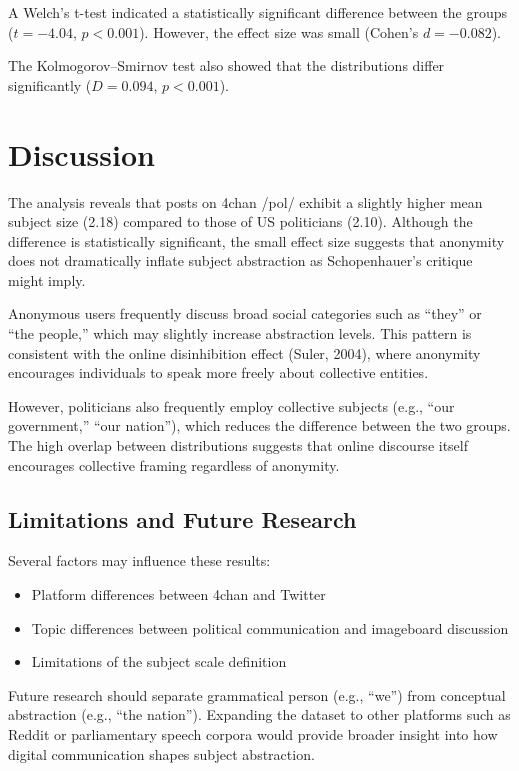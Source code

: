 \documentclass{article}
\begin{document}
A Welch's t-test indicated a statistically significant difference between
the groups ($t = -4.04$, $p < 0.001$). However, the effect size was small
(Cohen's $d = -0.082$).

The Kolmogorov–Smirnov test also showed that the distributions differ
significantly ($D = 0.094$, $p < 0.001$).

\section{Discussion}

The analysis reveals that posts on 4chan /pol/ exhibit a slightly higher mean 
subject size (2.18) compared to those of US politicians (2.10). Although the 
difference is statistically significant, the small effect size suggests that 
anonymity does not dramatically inflate subject abstraction as Schopenhauer's 
critique might imply.

Anonymous users frequently discuss broad social categories such as ``they'' 
or ``the people,'' which may slightly increase abstraction levels. This 
pattern is consistent with the online disinhibition effect (Suler, 2004), 
where anonymity encourages individuals to speak more freely about collective 
entities.

However, politicians also frequently employ collective subjects (e.g., 
``our government,'' ``our nation''), which reduces the difference between 
the two groups. The high overlap between distributions suggests that online 
discourse itself encourages collective framing regardless of anonymity.

\subsection{Limitations and Future Research}

Several factors may influence these results:

\begin{itemize}
\item Platform differences between 4chan and Twitter
\item Topic differences between political communication and imageboard discussion
\item Limitations of the subject scale definition
\end{itemize}

Future research should separate grammatical person (e.g., ``we'') from 
conceptual abstraction (e.g., ``the nation''). Expanding the dataset to other 
platforms such as Reddit or parliamentary speech corpora would provide 
broader insight into how digital communication shapes subject abstraction.
\end{document}
